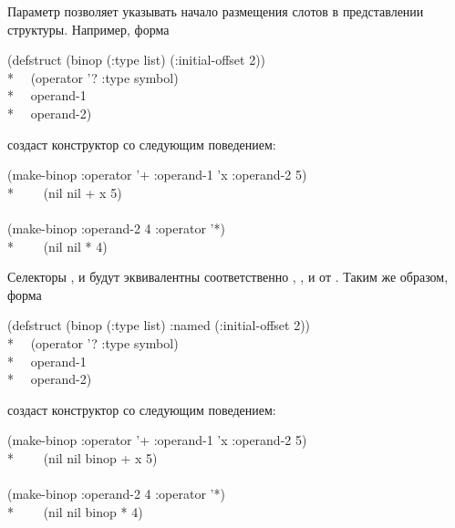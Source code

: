 Параметр  позволяет указывать начало размещения слотов в
представлении структуры. Например, форма
\begin{lisp}
(defstruct (binop (:type list) (:initial-offset 2)) \\*
~~(operator '? :type symbol) \\*
~~operand-1 \\*
~~operand-2)
\end{lisp}
создаст конструктор  со следующим поведением:
\begin{lisp}
(make-binop :operator '+ :operand-1 'x :operand-2 5) \\*
~~~\EV\ (nil nil + x 5) \\
\\
(make-binop :operand-2 4 :operator '*) \\*
~~~\EV\ (nil nil * {\nil} 4)
\end{lisp}
Селекторы
,  и  
будут эквивалентны соответственно ,
, и  от .
Таким же образом, форма
\begin{lisp}
(defstruct (binop (:type list) :named (:initial-offset 2)) \\*
~~(operator '? :type symbol) \\*
~~operand-1 \\*
~~operand-2)
\end{lisp}
создаст конструктор  со следующим поведением:
\begin{lisp}
(make-binop :operator '+ :operand-1 'x :operand-2 5) \\*
~~~\EV\ (nil nil binop + x 5) \\
\\
(make-binop :operand-2 4 :operator '*) \\*
~~~\EV\ (nil nil binop * {\nil} 4)
\end{lisp}

